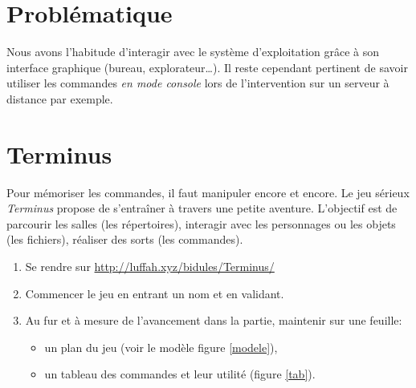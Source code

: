 \documentclass[a4paper,11pt]{article}
\begin{document}
\section{Problématique}
Nous avons l'habitude d'interagir avec le système d'exploitation grâce à son interface graphique (bureau, explorateur\dots). Il reste cependant pertinent de savoir utiliser les commandes \emph{en mode console} lors de l'intervention sur un serveur à distance par exemple.
\begin{center}
\end{center}
\section{Terminus}
Pour mémoriser les commandes, il faut manipuler encore et encore. Le jeu sérieux \emph{Terminus} propose de s'entraîner à travers une petite aventure. L'objectif est de parcourir les salles (les répertoires), interagir avec les personnages ou les objets (les fichiers), réaliser des sorts (les commandes).
\begin{activite}
\begin{enumerate}
    \item Se rendre sur \url{http://luffah.xyz/bidules/Terminus/}
    \item Commencer le jeu en entrant un nom et en validant.
    \item Au fur et à mesure de l'avancement dans la partie, maintenir sur une feuille:
    \begin{itemize}
        \item un plan du jeu (voir le modèle figure \ref{modele}),
        \item un tableau des commandes et leur utilité (figure \ref{tab}).
    \end{itemize}
\end{enumerate}
\end{activite}
\begin{center}
\label{modele}
\end{center}
\end{document}

